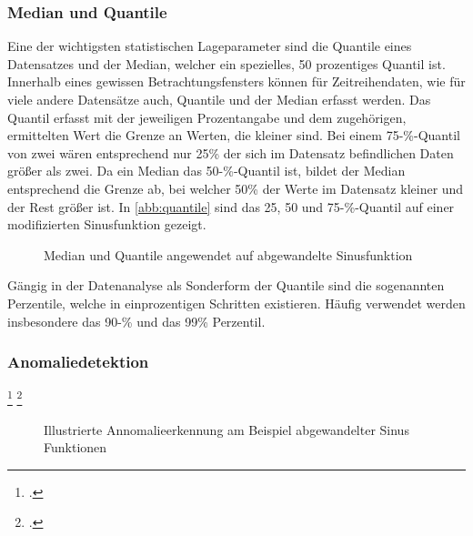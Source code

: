 \subsubsection{Median und Quantile}
Eine der wichtigsten statistischen Lageparameter sind die Quantile eines Datensatzes und der Median, welcher ein spezielles, 50 prozentiges Quantil ist. 
Innerhalb eines gewissen Betrachtungsfensters können für Zeitreihendaten, wie für viele andere Datensätze auch, Quantile und der Median erfasst werden. 
Das Quantil erfasst mit der jeweiligen Prozentangabe und dem zugehörigen, ermittelten Wert die Grenze an Werten, die kleiner sind. 
Bei einem 75-\%-Quantil von zwei wären entsprechend nur 25\% der sich im Datensatz befindlichen Daten größer als zwei. 
Da ein Median das 50-\%-Quantil ist, bildet der Median entsprechend die Grenze ab, bei welcher 50\% der Werte im Datensatz kleiner und der Rest größer ist. In \autoref{abb:quantile} sind das 25, 50 und 75-\%-Quantil auf einer modifizierten Sinusfunktion gezeigt.
\begin{figure}[H]
\centering
{}
\caption{Median und Quantile angewendet auf abgewandelte Sinusfunktion}
\label{abb:quantile}
\end{figure}

Gängig in der Datenanalyse als Sonderform der Quantile sind die sogenannten Perzentile, welche in einprozentigen Schritten existieren. Häufig verwendet werden insbesondere das 90-\% und das 99\% Perzentil.

\subsubsection{Anomaliedetektion}

\footcite[Vgl.][]{o.V..o.J.b} 
\footcite[Vgl.][]{Pai.2020}

\begin{figure}[H]
\centering
{}
\caption{Illustrierte Annomalieerkennung am Beispiel abgewandelter Sinus Funktionen}
\label{abb:anomalie}
\end{figure}

